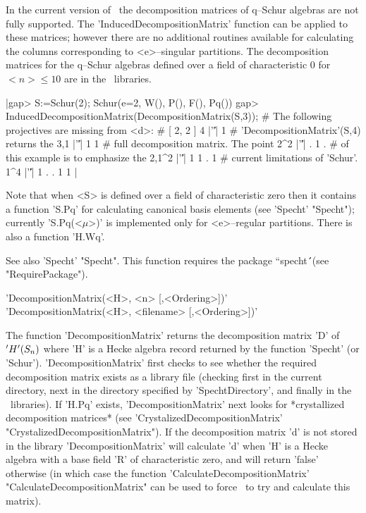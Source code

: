 In the current version of \Specht\ the decomposition matrices of q--Schur 
algebras are not fully supported. The 'InducedDecompositionMatrix' 
function can be applied to these matrices; however there are no additional
routines available for calculating the columns corresponding to 
<e>--singular partitions. The decomposition matrices for the q--Schur 
algebras defined over a field of characteristic 0 for $<n>\le10$ are in 
the \Specht\ libraries.

|gap> S:=Schur(2);
Schur(e=2, W(), P(), F(), Pq())
gap> InducedDecompositionMatrix(DecompositionMatrix(S,3));
# The following projectives are missing from <d>:
#  [ 2, 2 ]
4     |'\|'| 1                   # 'DecompositionMatrix'(S,4) returns the
3,1   |'\|'| 1 1                 # full decomposition matrix. The point
2^2   |'\|'| . 1 .               # of this example is to emphasize the
2,1^2 |'\|'| 1 1 . 1             # current limitations of 'Schur'.
1^4   |'\|'| 1 . . 1 1 
|

Note that when <S> is defined over a field of characteristic zero then
it contains a function 'S.Pq' for calculating canonical basis elements
(see 'Specht' "Specht"); currently 'S.Pq(<$\mu$>)' is implemented only 
for <e>--regular partitions. There is also a function 'H.Wq'.

See also 'Specht' "Specht". This function requires the package 
``specht\'\'\ (see "RequirePackage").



'DecompositionMatrix(<H>, <n> [,<Ordering>])'\\
'DecompositionMatrix(<H>, <filename> [,<Ordering>])'

The function 'DecompositionMatrix' returns the decomposition matrix 'D' of 
$'H'(S_n)$ where 'H' is a Hecke algebra record returned by the function 
'Specht' (or 'Schur'). 'DecompositionMatrix' first checks to see whether
the required decomposition matrix exists as a library file (checking first
in the current directory, next in the directory specified by 
'SpechtDirectory', and finally in the \Specht\ libraries). If 'H.Pq' 
exists, 'DecompositionMatrix' next looks for *crystallized decomposition 
matrices* (see 'CrystalizedDecompositionMatrix' "CrystalizedDecompositionMatrix").
If the decomposition matrix 'd' is not stored in the library
'DecompositionMatrix' will calculate 'd' when 'H' is a Hecke algebra with a
base field 'R' of characteristic zero, and will return 'false' otherwise
(in which case the function 'CalculateDecompositionMatrix'
"CalculateDecompositionMatrix" can be used to force \Specht\ to try and
calculate this matrix).

